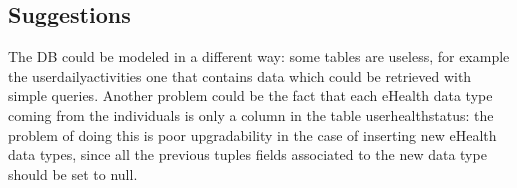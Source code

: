 \subsection{Suggestions}
The DB could be modeled in a different way: some tables are useless, for example the userdailyactivities one that contains data which could be retrieved with simple queries. 
Another problem could be the fact that each eHealth data type coming from the individuals is only a column in the table userhealthstatus: the problem of doing this is poor upgradability in the case of inserting new eHealth data types, since all the previous tuples fields associated to the new data type should be set to null.